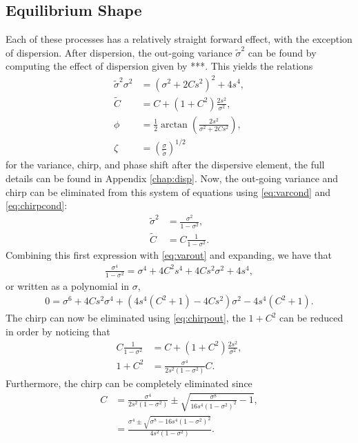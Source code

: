 \subsection{Equilibrium Shape}
Each of these processes has a relatively straight forward effect, with the exception of dispersion. After dispersion, the out-going variance $\widetilde{\sigma}^2$ can be found by computing the effect of dispersion given by ***. This yields the relations
\begin{subequations}
\begin{align}
\label{eq:varout}
\widetilde{\sigma}^2 \sigma^2 &= \left( \sigma^2 + 2 C s^2 \right)^2 + 4s^4, \\
\label{eq:chirpout}
\widetilde{C} &= C + (1+C^2) \frac{2 s^2}{\sigma^2}, \\
\label{eq:phase}
\phi &= \frac{1}{2} \arctan \left( \frac{2s^2}{\sigma^2 + 2C s^2} \right), \\
\zeta &= \left( \frac{\sigma}{\widetilde{\sigma}} \right)^{1/2}
\end{align}
\end{subequations}
for the variance, chirp, and phase shift after the dispersive element, the full details can be found in Appendix \ref{chap:disp}. Now, the out-going variance and chirp can be eliminated from this system of equations using \eqref{eq:varcond} and \eqref{eq:chirpcond}:
\begin{align*}
\widetilde{\sigma}^2 &= \frac{\sigma^2}{1 - \sigma^2}, \\
\widetilde{C} &= C \frac{1}{1 - \sigma^2}.
\end{align*}
Combining this first expression with \eqref{eq:varout} and expanding, we have that
\begin{align*}
\frac{\sigma^4}{1 - \sigma^2} = \sigma^4 + 4 C^2 s^4 + 4 C s^2 \sigma^2 + 4s^4,
\end{align*}
or written as a polynomial in $\sigma$,
\begin{align*}
0 = \sigma^6 + 4 C s^2 \sigma^4 + \left( 4s^4 (C^2 + 1) - 4 C s^2 \right) \sigma^2 - 4s^4 (C^2 + 1).
\end{align*}
The chirp can now be eliminated using \eqref{eq:chirpout}, the $1+C^2$ can be reduced in order by noticing that
\begin{align*}
C \frac{1}{1 - \sigma^2} &= C + (1 + C^2) \frac{2s^2}{\sigma^2}, \\
1 + C^2 &= \frac{\sigma^4}{2s^2(1 - \sigma^2)} C.
\end{align*}
Furthermore, the chirp can be completely eliminated since
\begin{align}
\nonumber
C &= \frac{\sigma^4}{2s^2(1 - \sigma^2)} \pm \sqrt{\frac{\sigma^8}{16s^4(1 - \sigma^2)^2} - 1}, \\
\label{eq:equilchirp}
&= \frac{\sigma^4 \pm \sqrt{\sigma^8 - 16s^4(1 - \sigma^2)^2}}{4s^2(1 - \sigma^2)}.
\end{align}

